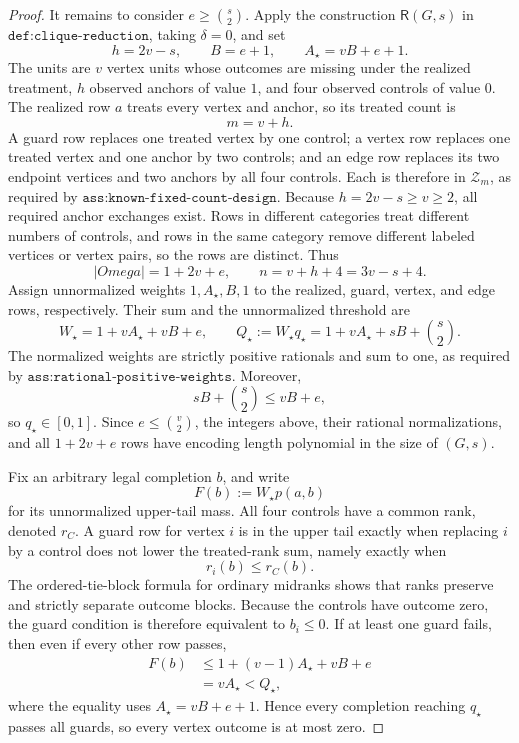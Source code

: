 \documentclass{article}
\begin{document}
\begin{proof}
It remains to consider \(e\ge\binom{s}{2}\).  Apply the construction \(\mathsf R(G,s)\) in \(\texttt{def:clique-reduction}\), taking \(\delta=0\), and set
\[
 h=2v-s,\qquad B=e+1,\qquad
 A_\star=vB+e+1.
\]
The units are \(v\) vertex units whose outcomes are missing under the realized treatment, \(h\) observed anchors of value \(1\), and four observed controls of value \(0\).  The realized row \(a\) treats every vertex and anchor, so its treated count is
\[
 m=v+h.
\]
A guard row replaces one treated vertex by one control; a vertex row replaces one treated vertex and one anchor by two controls; and an edge row replaces its two endpoint vertices and two anchors by all four controls.  Each is therefore in \(\mathcal Z_m\), as required by \(\texttt{ass:known-fixed-count-design}\).  Because \(h=2v-s\ge v\ge2\), all required anchor exchanges exist.  Rows in different categories treat different numbers of controls, and rows in the same category remove different labeled vertices or vertex pairs, so the rows are distinct.  Thus
\[
 |Omega|=1+2v+e,
 \qquad
 n=v+h+4=3v-s+4.
\]
Assign unnormalized weights \(1,A_\star,B,1\) to the realized, guard, vertex, and edge rows, respectively.  Their sum and the unnormalized threshold are
\[
 W_\star=1+vA_\star+vB+e,
 \qquad
 Q_\star:=W_\star q_\star
 =1+vA_\star+sB+\binom{s}{2}.
\]
The normalized weights are strictly positive rationals and sum to one, as required by \(\texttt{ass:rational-positive-weights}\).  Moreover,
\[
 sB+\binom{s}{2}\le vB+e,
\]
so \(q_\star\in[0,1]\).  Since \(e\le\binom v2\), the integers above, their rational normalizations, and all \(1+2v+e\) rows have encoding length polynomial in the size of \((G,s)\).

Fix an arbitrary legal completion \(b\), and write
\[
 F(b):=W_\star p(a,b)
\]
for its unnormalized upper-tail mass.  All four controls have a common rank, denoted \(r_C\).  A guard row for vertex \(i\) is in the upper tail exactly when replacing \(i\) by a control does not lower the treated-rank sum, namely exactly when
\[
 r_i(b)\le r_C(b).
\]
The ordered-tie-block formula for ordinary midranks shows that ranks preserve and strictly separate outcome blocks.  Because the controls have outcome zero, the guard condition is therefore equivalent to \(b_i\le0\).  If at least one guard fails, then even if every other row passes,
\[
\begin{aligned}
 F(b)
 &\le 1+(v-1)A_\star+vB+e\\
 &=vA_\star
 <Q_\star,
\end{aligned}
\]
where the equality uses \(A_\star=vB+e+1\).  Hence every completion reaching \(q_\star\) passes all guards, so every vertex outcome is at most zero.


\end{proof}
\end{document}
